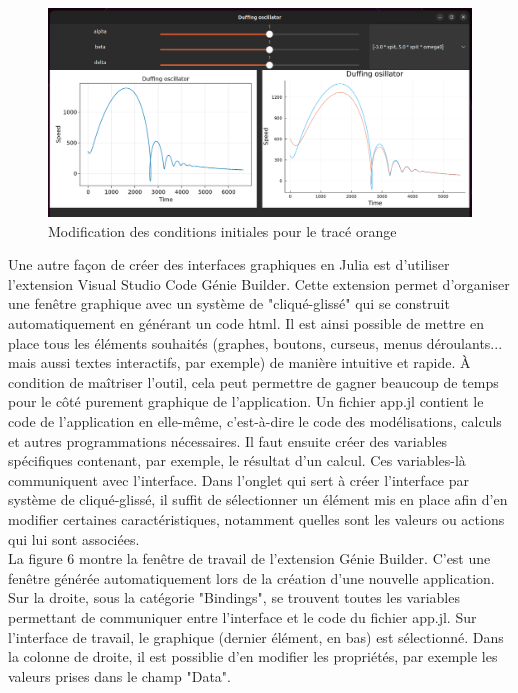 \documentclass[a4paper, french, 12pt, titlepage]{article}
\begin{document}
\begin{figure}[htb]
  \includegraphics[width=\linewidth]{interactivewindow_4.png}
  \caption{Modification des conditions initiales pour le tracé orange}
  \label{fig:organigramme}
\end{figure}


Une autre façon de créer des interfaces graphiques en Julia est d'utiliser l'extension Visual Studio Code Génie Builder. Cette extension permet d'organiser une fenêtre graphique avec un système de "cliqué-glissé" qui se construit automatiquement en générant un code html. Il est ainsi possible de mettre en place tous les éléments souhaités (graphes, boutons, curseus, menus déroulants... mais aussi textes interactifs, par exemple) de manière intuitive et rapide. À condition de maîtriser l'outil, cela peut permettre de gagner beaucoup de temps pour le côté purement graphique de l'application. Un fichier app.jl contient le code de l'application en elle-même, c'est-à-dire le code des modélisations, calculs et autres programmations nécessaires. Il faut ensuite créer des variables spécifiques contenant, par exemple, le résultat d'un calcul. Ces variables-là communiquent avec l'interface. Dans l'onglet qui sert à créer l'interface par système de cliqué-glissé, il suffit de sélectionner un élément mis en place afin d'en modifier certaines caractéristiques, notamment quelles sont les valeurs ou actions qui lui sont associées. \\

La figure 6 montre la fenêtre de travail de l'extension Génie Builder. C'est une fenêtre générée automatiquement lors de la création d'une nouvelle application. Sur la droite, sous la catégorie "Bindings", se trouvent toutes les variables permettant de communiquer entre l'interface et le code du fichier app.jl. Sur l'interface de travail, le graphique (dernier élément, en bas) est sélectionné. Dans la colonne de droite, il est possiblie d'en modifier les propriétés, par exemple les valeurs prises dans le champ "Data". \\
\end{document}
